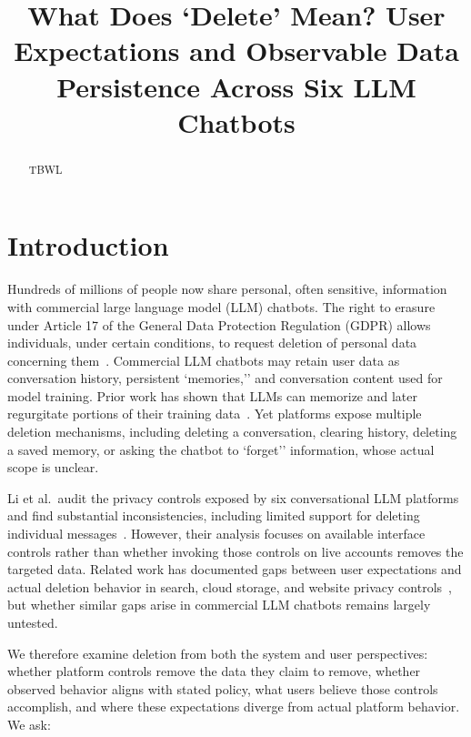 \documentclass[conference,compsoc]{IEEEtran}
\title{What Does ‘Delete’ Mean? User Expectations and Observable Data Persistence Across Six LLM Chatbots}
\author{\IEEEauthorblockN{Anonymous Author(s)}
\IEEEauthorblockA{Submission \#XXX}}
\begin{document}
\maketitle

\begin{abstract}
TBWL
\end{abstract}

\section{Introduction}
\label{sec:intro}

Hundreds of millions of people now share personal, often sensitive,
information with commercial large language model (LLM) chatbots. The
right to erasure under Article 17 of the General Data Protection
Regulation (GDPR) allows individuals, under certain conditions, to
request deletion of personal data concerning them~\cite{gdpr2016}.
Commercial LLM chatbots may retain user data as conversation history,
persistent `memories,'' and conversation content used for model
training. Prior work has shown that LLMs can memorize and later
regurgitate portions of their training data~\cite{carlini2021extracting}.
Yet platforms expose multiple deletion mechanisms, including deleting a
conversation, clearing history, deleting a saved memory, or asking the
chatbot to `forget'' information, whose actual scope is unclear.

Li et al.\ audit the privacy controls exposed by six conversational LLM
platforms and find substantial inconsistencies, including limited support
for deleting individual messages~\cite{li2026privacy}. However, their
analysis focuses on available interface controls rather than whether
invoking those controls on live accounts removes the targeted data.
Related work has documented gaps between user expectations and actual
deletion behavior in search, cloud storage, and website privacy
controls~\cite{bertram2019five,kang2015mydata,ramokapane2017stupid,habib2019empirical},
but whether similar gaps arise in commercial LLM chatbots remains largely
untested.

We therefore examine deletion from both the system and user perspectives:
whether platform controls remove the data they claim to remove, whether
observed behavior aligns with stated policy, what users believe those
controls accomplish, and where these expectations diverge from actual
platform behavior. We ask:
\end{document}

